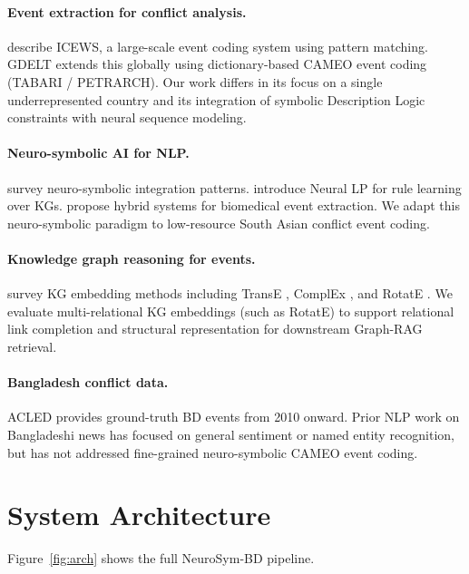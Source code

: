 \documentclass[11pt,a4paper]{article}
\begin{document}
\paragraph{Event extraction for conflict analysis.}
\citet{boschee2015icews} describe ICEWS, a large-scale event coding
system using pattern matching. GDELT \citep{leetaru2013} extends this
globally using dictionary-based CAMEO event coding (TABARI / PETRARCH). Our work differs in its
focus on a single underrepresented country and its integration of
symbolic Description Logic constraints with neural sequence modeling.

\paragraph{Neuro-symbolic AI for NLP.}
\citet{garcez2023} survey neuro-symbolic integration patterns.
\citet{yang2017} introduce Neural LP for rule learning over KGs.
\citet{zhang2022} propose hybrid systems for biomedical event extraction.
We adapt this neuro-symbolic paradigm to low-resource South Asian conflict event coding.

\paragraph{Knowledge graph reasoning for events.}
\citet{rossi2021} survey KG embedding methods including TransE
\citep{bordes2013}, ComplEx \citep{trouillon2016}, and RotatE
\citep{sun2019}.
We evaluate multi-relational KG embeddings (such as RotatE) to support relational
link completion and structural representation for downstream Graph-RAG retrieval.

\paragraph{Bangladesh conflict data.}
ACLED \citep{raleigh2010} provides ground-truth BD events from
2010 onward. Prior NLP work on Bangladeshi news has focused on general sentiment or named entity recognition, but has not addressed fine-grained neuro-symbolic CAMEO event coding.

\section{System Architecture}
\label{sec:system}

Figure~\ref{fig:arch} shows the full NeuroSym-BD pipeline.
\end{document}
